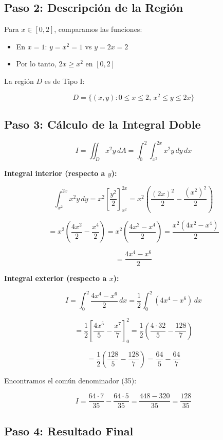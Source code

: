 \documentclass[12pt, a4paper]{book}
\begin{document}
\subsection{Paso 2: Descripción de la Región}

Para $x \in [0,2]$, comparamos las funciones:
\begin{itemize}
    \item En $x = 1$: $y = x^2 = 1$ vs $y = 2x = 2$
    \item Por lo tanto, $2x \geq x^2$ en $[0,2]$
\end{itemize}

La región $D$ es de Tipo I:

\[
D = \{(x,y) : 0 \leq x \leq 2, \, x^2 \leq y \leq 2x\}
\]

\subsection{Paso 3: Cálculo de la Integral Doble}

\[
I = \iint_D x^2 y \, dA = \int_0^2 \int_{x^2}^{2x} x^2 y \, dy \, dx
\]

\textbf{Integral interior (respecto a $y$):}

\[
\int_{x^2}^{2x} x^2 y \, dy = x^2 \left[\frac{y^2}{2}\right]_{x^2}^{2x} = x^2 \left(\frac{(2x)^2}{2} - \frac{(x^2)^2}{2}\right)
\]

\[
= x^2 \left(\frac{4x^2}{2} - \frac{x^4}{2}\right) = x^2 \left(\frac{4x^2 - x^4}{2}\right) = \frac{x^2(4x^2 - x^4)}{2}
\]

\[
= \frac{4x^4 - x^6}{2}
\]

\textbf{Integral exterior (respecto a $x$):}

\[
I = \int_0^2 \frac{4x^4 - x^6}{2} \, dx = \frac{1}{2} \int_0^2 (4x^4 - x^6) \, dx
\]

\[
= \frac{1}{2} \left[\frac{4x^5}{5} - \frac{x^7}{7}\right]_0^2 = \frac{1}{2} \left(\frac{4 \cdot 32}{5} - \frac{128}{7}\right)
\]

\[
= \frac{1}{2} \left(\frac{128}{5} - \frac{128}{7}\right) = \frac{64}{5} - \frac{64}{7}
\]

Encontramos el común denominador (35):

\[
I = \frac{64 \cdot 7}{35} - \frac{64 \cdot 5}{35} = \frac{448 - 320}{35} = \frac{128}{35}
\]

\subsection{Paso 4: Resultado Final}
\end{document}
